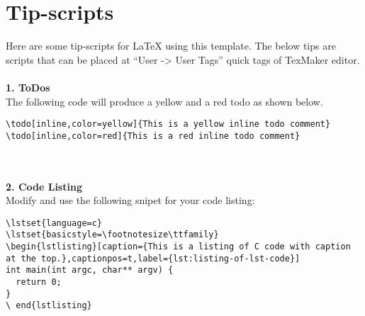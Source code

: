 \section{Tip-scripts}
Here are some tip-scripts for LaTeX using this template. The below tips are scripts that can be placed at ``User -> User Tags'' quick tags  of TexMaker editor.
\\ \\ %
\textbf{1. ToDos} \\
The following code will produce a yellow and a red todo as shown below.
\begin{lstlisting}
\todo[inline,color=yellow]{This is a yellow inline todo comment}
\todo[inline,color=red]{This is a red inline todo comment}
\end{lstlisting}
~\\ \\ %
\textbf{2. Code Listing} \\
Modify and use the following snipet for your code listing:
\lstset{language=tex}
\begin{lstlisting}
\lstset{language=c}
\lstset{basicstyle=\footnotesize\ttfamily}
\begin{lstlisting}[caption={This is a listing of C code with caption at the top.},captionpos=t,label={lst:listing-of-lst-code}]
int main(int argc, char** argv) {
  return 0;
}
\ end{lstlisting}
\end{lstlisting}

